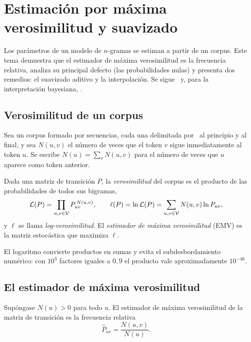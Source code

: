 \chapter{Estimación por máxima verosimilitud y suavizado}
\label{tema:3}

Los parámetros de un modelo de $n$-gramas se estiman a partir de un corpus. Este tema demuestra que el estimador de máxima verosimilitud es la frecuencia relativa, analiza su principal defecto (las probabilidades nulas) y presenta dos remedios: el suavizado aditivo y la interpolación. Se sigue~\cite[§3.1.2 y §3.6]{jm3} y, para la interpretación bayesiana, \cite[§2.2]{bishop}.

\section{Verosimilitud de un corpus}

Sea un corpus formado por secuencias, cada una delimitada por \fin\ al principio y al final, y sea $N(u,v)$ el número de veces que el token $v$ sigue inmediatamente al token $u$. Se escribe $N(u)=\sum_{v}N(u,v)$ para el número de veces que $u$ aparece como token anterior.

\begin{definicion}[Verosimilitud]
Dada una matriz de transición $P$, la \emph{verosimilitud} del corpus es el producto de las probabilidades de todos sus bigramas,
\[
\mathcal{L}(P)=\prod_{u,v\in\mathcal{V}}P_{uv}^{\,N(u,v)},
\qquad
\ell(P)=\ln\mathcal{L}(P)=\sum_{u,v\in\mathcal{V}}N(u,v)\ln P_{uv},
\]
y $\ell$ se llama \emph{log-verosimilitud}. El \emph{estimador de máxima verosimilitud} (EMV) es la matriz estocástica que maximiza $\ell$.
\end{definicion}

El logaritmo convierte productos en sumas y evita el subdesbordamiento numérico: con $10^{3}$ factores iguales a $0{,}9$ el producto vale aproximadamente $10^{-46}$.

\section{El estimador de máxima verosimilitud}

\begin{teorema}\label{teo:emv}
Supóngase $N(u)>0$ para todo $u$. El estimador de máxima verosimilitud de la matriz de transición es la frecuencia relativa
\[
\widehat{P}_{uv}=\frac{N(u,v)}{N(u)}.
\]
\end{teorema}

